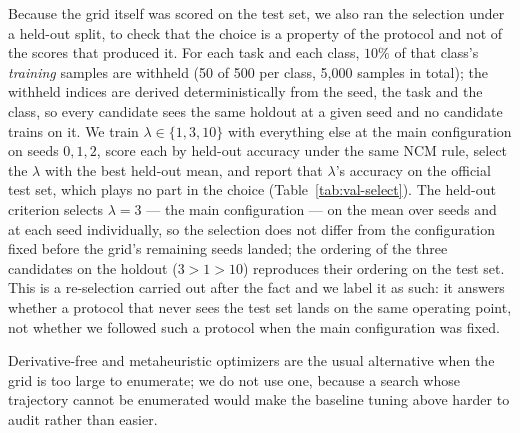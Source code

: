 Because the grid itself was scored on the test set, we also ran the selection under a
held-out split, to check that the choice is a property of the protocol and not of the scores
that produced it. For each task and each class, $10\%$ of that class's \emph{training}
samples are withheld (50 of 500 per class, 5{,}000 samples in total); the withheld indices
are derived deterministically from the seed, the task and the class, so every candidate
sees the same holdout at a given seed and no candidate trains on it. We train
$\lambda\in\{1,3,10\}$ with everything else at the main configuration on seeds $0,1,2$, score
each by held-out accuracy under the same NCM rule, select the $\lambda$ with the best
held-out mean, and report that $\lambda$'s accuracy on the official test set, which plays no
part in the choice (Table~\ref{tab:val-select}). The held-out criterion selects
$\lambda{=}3$ --- the main configuration --- on the mean over seeds and at each seed
individually, so the selection does not differ from the configuration fixed before the grid's
remaining seeds landed; the ordering of the three candidates on the holdout ($3>1>10$)
reproduces their ordering on the test set.
This is a re-selection carried out after the fact and we label it as such: it answers whether
a protocol that never sees the test set lands on the same operating point, not whether we
followed such a protocol when the main configuration was fixed.

Derivative-free
and metaheuristic optimizers are the usual alternative when the grid is too large to
enumerate; we do not use one, because a search whose trajectory cannot be enumerated would
make the baseline tuning above harder to audit rather than easier.

